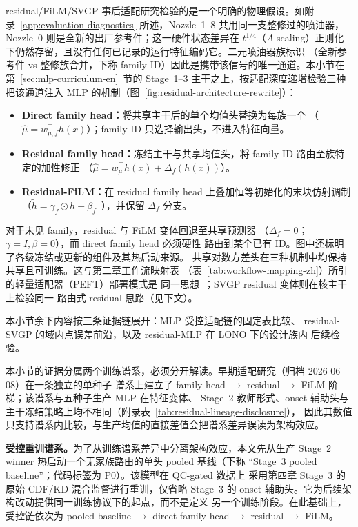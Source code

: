 residual/FiLM/SVGP 事后适配研究检验的是一个明确的物理假设。如附录~\ref{app:evaluation-diagnostics}
所述，Nozzle~1--8 共用同一支整修过的喷油器，Nozzle~0 则是全新的出厂参考件；这一硬件状态差异在
\(t^{1/4}\)（\(A\)-scaling）正则化下仍然存留，且没有任何已记录的运行特征编码它。二元喷油器族标识
（全新参考件 vs 整修族合并，下称 family ID）因此是携带该信号的唯一通道。本小节在
第~\ref{sec:mlp-curriculum-en}~节的 Stage~1--3 主干之上，按适配深度递增检验三种把该通道注入 MLP
的机制（图~\ref{fig:residual-architecture-rewrite}）：
\begin{itemize}
  \item \textbf{Direct family head：}将共享主干后的单个均值头替换为每族一个
  （\(\hat\mu = w_{\mu,f}^{\top} h(x)\)）；family ID 只选择输出头，不进入特征向量。
  \item \textbf{Residual family head：}冻结主干与共享均值头，将 family ID 路由至族特定的加性修正
  （\(\hat\mu = w_{\mu}^{\top} h(x) + \Delta_f(h(x))\)）。
  \item \textbf{Residual-FiLM：}在 residual family head 上叠加恒等初始化的末块仿射调制
  （\(\tilde h = \gamma_f \odot h + \beta_f\)~\cite{Perez2018FiLM}），并保留 \(\Delta_f\) 分支。
\end{itemize}
对于未见 family，residual 与 FiLM 变体回退至共享预测器
（\(\Delta_f=0\)；\(\gamma=I,\beta=0\)），而 direct family head 必须硬性
路由到某个已有 ID。图中还标明了各级冻结或更新的组件及其热启动来源。
共享对数方差头在三种机制中均保持共享且可训练。这与第二章工作流映射表
（表~\ref{tab:workflow-mapping-zh}）所引的轻量适配器（PEFT）部署模式是
同一思想~\cite{Han2024PEFT}；SVGP residual 变体则在核主干上检验同一
路由式 residual 思路（见下文）。

本小节余下内容按三条证据链展开：MLP 受控适配链的固定表比较、
residual-SVGP 的域内点误差前沿，以及 residual-MLP 在 LONO 下的设计族内
后续检验。

本小节的证据分属两个训练谱系，必须分开解读。早期适配研究（归档 2026-06-08）在一条独立的单种子
谱系上建立了 family-head \(\to\) residual \(\to\) FiLM 阶梯；该谱系与五种子生产 MLP 在特征变体、
Stage~2 教师形式、onset 辅助头与主干冻结策略上均不相同（附录表~\ref{tab:residual-lineage-disclosure}），
因此其数值只支持谱系内比较，与生产均值的直接差值会把谱系差异误读为架构效应。

\textbf{受控重训谱系。}为了从训练谱系差异中分离架构效应，本文先从生产
Stage~2 winner 热启动一个无家族路由的单头 pooled 基线（下称
``Stage~3 pooled baseline''；代码标签为 P0）。该模型在 QC-gated 数据上
采用第四章 Stage~3 的原始 CDF/KD 混合监督进行重训，仅省略 Stage~3 的
onset 辅助头。它为后续架构改动提供同一训练协议下的起点，而不是定义
另一个训练阶段。在此基础上，受控链依次为 pooled baseline \(\to\)
direct family head \(\to\) residual \(\to\) FiLM。

